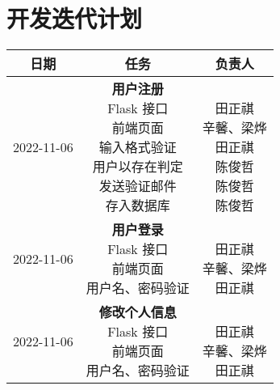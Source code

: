 \section{开发迭代计划}

\begin{table}[h!]
    \centering
    \begin{tabular}{ccc}\toprule
        \textbf{日期} & \textbf{任务} & \textbf{负责人} \\\midrule
        2022-11-06 & \makecell[l]{\textbf{用户注册} \\
            Flask 接口 \\
            前端页面 \\
            输入格式验证 \\
            用户以存在判定 \\
            发送验证邮件 \\
            存入数据库
        } & \makecell{ \\
            田正祺 \\
            辛馨、梁烨 \\
            田正祺 \\
            陈俊哲 \\
            陈俊哲 \\
            陈俊哲 \\
        } \\\midrule
        2022-11-06 & \makecell[l]{\textbf{用户登录} \\
            Flask 接口 \\
            前端页面 \\
            用户名、密码验证 \\
        } & \makecell{ \\
            田正祺 \\
            辛馨、梁烨 \\
            田正祺 \\
        } \\\midrule
        2022-11-06 & \makecell[l]{\textbf{修改个人信息} \\
            Flask 接口 \\
            前端页面 \\
            用户名、密码验证 \\
        } & \makecell{ \\
            田正祺 \\
            辛馨、梁烨 \\
            田正祺 \\
}
\end{tabular}
\end{table}
